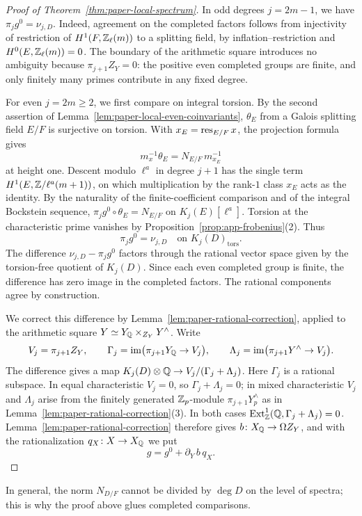 \begin{proof}[Proof of Theorem~\ref{thm:paper-local-spectrum}]
In odd degrees $j=2m-1$, we have $\pi_jg^0=\nu_{j,D}$.
Indeed, agreement on the completed factors follows from injectivity of restriction of $H^1(F,\mathbb Z_\ell(m))$ to a splitting field, by inflation--restriction and $H^0(E,\mathbb Z_\ell(m))=0$.
The boundary of the arithmetic square introduces no ambiguity because $\pi_{j+1}Z_Y=0$: the positive even completed groups are finite, and only finitely many primes contribute in any fixed degree.

For even $j=2m\ge2$, we first compare on integral torsion.
By the second assertion of Lemma~\ref{lem:paper-local-even-coinvariants}, $\theta_E$ from a Galois splitting field $E/F$ is surjective on torsion.
With $x_E=\operatorname{res}_{E/F}x$, the projection formula gives
\[
 m_x^{-1}\theta_E=N_{E/F}\,m_{x_E}^{-1}
\]
at height one.
Descent modulo $\ell^a$ in degree $j+1$ has the single term $H^1(E,\mathbb Z/\ell^a(m+1))$, on which multiplication by the rank-$1$ class $x_E$ acts as the identity.
By the naturality of the finite-coefficient comparison and of the integral Bockstein sequence, $\pi_jg^0\circ\theta_E=N_{E/F}$ on $K_j(E)[\ell^a]$.
Torsion at the characteristic prime vanishes by Proposition~\ref{prop:app-frobenius}(2).
Thus
\[
 \pi_jg^0=\nu_{j,D}\quad\text{on }K_j(D)_{\mathrm{tors}}.
\]
The difference $\nu_{j,D}-\pi_jg^0$ factors through the rational vector space given by the torsion-free quotient of $K_j(D)$.
Since each even completed group is finite, the difference has zero image in the completed factors.
The rational components agree by construction.

We correct this difference by Lemma~\ref{lem:paper-rational-correction}, applied to the arithmetic square $Y\simeq Y_\mathbb Q\times_{Z_Y}Y^\wedge$.
Write
\[
 V_j=\pi_{j+1}Z_Y,\qquad
 \Gamma_j=\operatorname{im}\bigl(\pi_{j+1}Y_{\mathbb Q}\to V_j\bigr),\qquad
 \Lambda_j=\operatorname{im}\bigl(\pi_{j+1}Y^\wedge\to V_j\bigr).
\]
The difference gives a map $K_j(D)\otimes\mathbb Q\to V_j/(\Gamma_j+\Lambda_j)$.
Here $\Gamma_j$ is a rational subspace.
In equal characteristic $V_j=0$, so $\Gamma_j+\Lambda_j=0$; in mixed characteristic $V_j$ and $\Lambda_j$ arise from the finitely generated $\mathbb Z_p$-module $\pi_{j+1}Y^\wedge_p$ as in Lemma~\ref{lem:paper-rational-correction}(3).
In both cases $\operatorname{Ext}^1_{\mathbb Z}(\mathbb Q,\Gamma_j+\Lambda_j)=0$.
Lemma~\ref{lem:paper-rational-correction} therefore gives $b\colon X_{\mathbb Q}\to\Omega Z_Y$, and with the rationalization $q_X\colon X\to X_{\mathbb Q}$ we put
\[
 g=g^0+\partial_Y\,b\,q_X.
\]
\end{proof}

In general, the norm $N_{D/F}$ cannot be divided by $\deg D$ on the level of spectra; this is why the proof above glues completed comparisons.

